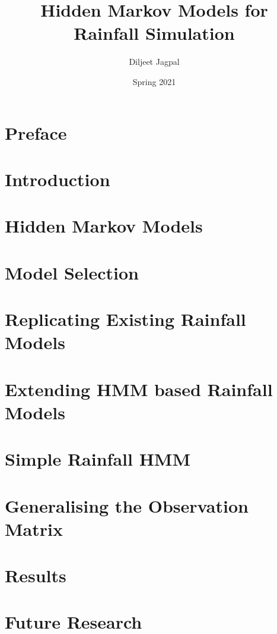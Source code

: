 \documentclass[a4paper,12pt]{report}
\title{\Huge Hidden Markov Models for Rainfall Simulation}
\author{Diljeet Jagpal}
\date{Spring 2021}
\theoremstyle{plain}
\begin{document}
    \maketitle

    \chapter*{Preface}
    \label{Abstract}
    

	\tableofcontents

	\newpage

	\chapter{Introduction}
    \label{Introduction}
	
	\newpage

	\chapter{Hidden Markov Models}
	\label{Hidden_Markov}
	
	\newpage

	\chapter{Model Selection}
    \label{Model_Selection}
	
	\newpage

	\chapter{Replicating Existing Rainfall Models}
	\label{Replicating_Existing_Rainfall_Model}
    
	\newpage

	\chapter{Extending HMM based Rainfall Models}
	\label{Extending_HMM_Based_Rainfall_Models}
    
	\newpage

	\chapter{Simple Rainfall HMM}
	\label{Simple_Rainfall_HMM}
    
	\newpage

	\chapter{Generalising the Observation Matrix}
	\label{Generalising_the_Observation_Matrix}
    
	\newpage

	\chapter{Results}
    \label{Results}
	
	\newpage

	\chapter{Future Research}
	\label{Future_Research}
    
	\newpage

	\nocite{*}
	\printbibliography
\end{document}
